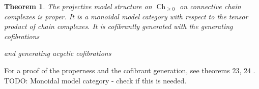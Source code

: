 \documentclass{scrartcl}
\theoremstyle{plain}
\newtheorem{theorem}{Theorem}[section]
\theoremstyle{definition}
\DeclareMathOperator{\Ch}{Ch}
\begin{document}
\begin{theorem}
    The projective model structure on $\Ch_{\geq 0}$ on connective chain complexes is proper. It is a monoidal model category with respect to the tensor product of chain complexes. It is cofibrantly generated with the generating cofibrations

    \begin{center}
    \end{center}

  and generating acyclic cofibrations
    \begin{center}
    \end{center}
    \end{theorem}
For a proof of the properness and the cofibrant generation, see theorems 23, 24 \cite{strickland2020model}. TODO: Monoidal model category - check if this is needed.
\end{document}
